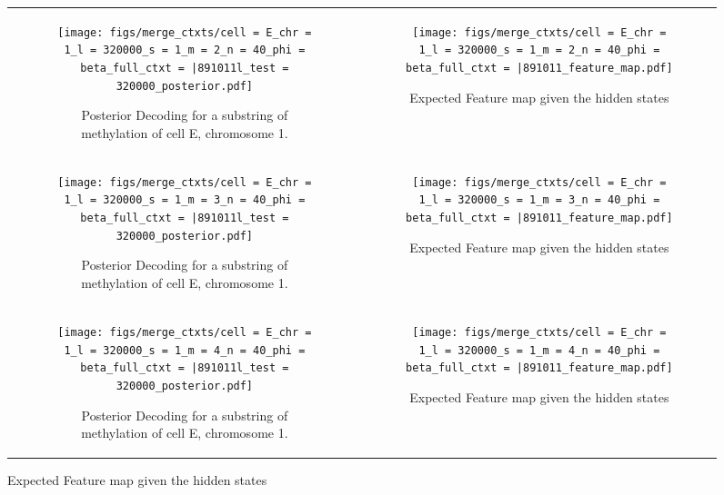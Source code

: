 \documentclass{article}
\begin{document}
\begin{figure}[H]
    \begin{tabular}{cc}
      \begin{subfigure}[t]{0.4\textwidth}
        \texttt{[image: figs/merge\_ctxts/cell = E\_chr = 1\_l = 320000\_s = 1\_m = 2\_n = 40\_phi = beta\_full\_ctxt = |891011l\_test = 320000\_posterior.pdf]}
        \caption{Posterior Decoding for a substring of methylation of cell E, chromosome 1.}
      \end{subfigure}
      &
      \begin{subfigure}[t]{0.4\textwidth}
        \texttt{[image: figs/merge\_ctxts/cell = E\_chr = 1\_l = 320000\_s = 1\_m = 2\_n = 40\_phi = beta\_full\_ctxt = |891011\_feature\_map.pdf]}
        \caption{Expected Feature map given the hidden states}
      \end{subfigure}
      \\
      \begin{subfigure}[t]{0.4\textwidth}
        \texttt{[image: figs/merge\_ctxts/cell = E\_chr = 1\_l = 320000\_s = 1\_m = 3\_n = 40\_phi = beta\_full\_ctxt = |891011l\_test = 320000\_posterior.pdf]}
        \caption{Posterior Decoding for a substring of methylation of cell E, chromosome 1.}
      \end{subfigure}
      &
      \begin{subfigure}[t]{0.4\textwidth}
        \texttt{[image: figs/merge\_ctxts/cell = E\_chr = 1\_l = 320000\_s = 1\_m = 3\_n = 40\_phi = beta\_full\_ctxt = |891011\_feature\_map.pdf]}
        \caption{Expected Feature map given the hidden states}
      \end{subfigure}
      \\
      \begin{subfigure}[t]{0.4\textwidth}
        \texttt{[image: figs/merge\_ctxts/cell = E\_chr = 1\_l = 320000\_s = 1\_m = 4\_n = 40\_phi = beta\_full\_ctxt = |891011l\_test = 320000\_posterior.pdf]}
        \caption{Posterior Decoding for a substring of methylation of cell E, chromosome 1.}
      \end{subfigure}
      &
      \begin{subfigure}[t]{0.4\textwidth}
        \texttt{[image: figs/merge\_ctxts/cell = E\_chr = 1\_l = 320000\_s = 1\_m = 4\_n = 40\_phi = beta\_full\_ctxt = |891011\_feature\_map.pdf]}
        \caption{Expected Feature map given the hidden states}
      \end{subfigure}
    \end{tabular}
  \end{figure}
\end{document}
